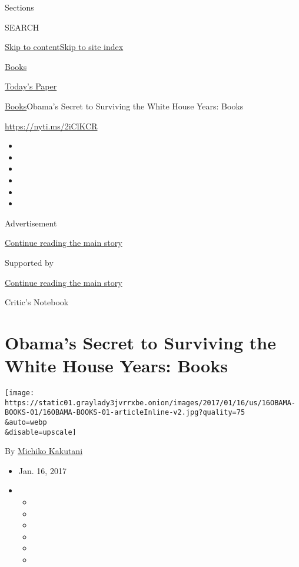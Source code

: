 Sections

SEARCH

\protect\hyperlink{site-content}{Skip to
content}\protect\hyperlink{site-index}{Skip to site index}

\href{https://www.nytimes3xbfgragh.onion/section/books}{Books}

\href{https://myaccount.nytimes3xbfgragh.onion/auth/login?response_type=cookie\&client_id=vi}{}

\href{https://www.nytimes3xbfgragh.onion/section/todayspaper}{Today's
Paper}

\href{/section/books}{Books}\textbar{}Obama's Secret to Surviving the
White House Years: Books

\url{https://nyti.ms/2iClKCR}

\begin{itemize}
\item
\item
\item
\item
\item
\item
\end{itemize}

Advertisement

\protect\hyperlink{after-top}{Continue reading the main story}

Supported by

\protect\hyperlink{after-sponsor}{Continue reading the main story}

Critic's Notebook

\hypertarget{obamas-secret-to-surviving-the-white-house-years-books}{%
\section{Obama's Secret to Surviving the White House Years:
Books}\label{obamas-secret-to-surviving-the-white-house-years-books}}

\texttt{[image: https://static01.graylady3jvrrxbe.onion/images/2017/01/16/us/16OBAMA-BOOKS-01/16OBAMA-BOOKS-01-articleInline-v2.jpg?quality=75\\\&auto=webp\\\&disable=upscale]}

By \href{http://www.nytimes3xbfgragh.onion/by/michiko-kakutani}{Michiko
Kakutani}

\begin{itemize}
\item
  Jan. 16, 2017
\item
  \begin{itemize}
  \item
  \item
  \item
  \item
  \item
  \item
  \end{itemize}
\end{itemize}

